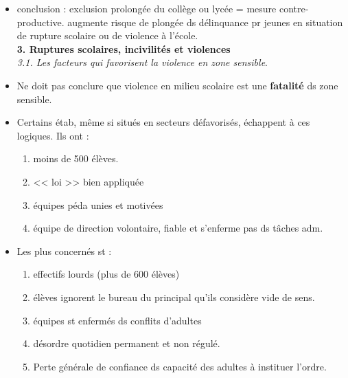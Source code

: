 \documentclass[12pt]{report}
\begin{document}
\begin{itemize}
\begin{itemize}
\vspace{0.5cm}

 \item conclusion : exclusion prolongée du collège ou lycée = mesure contre-productive. augmente risque de plongée ds délinquance pr jeunes en situation de rupture scolaire ou de violence à l'école.\\


\textbf{3. Ruptures scolaires, incivilités et violences} \\
\textit{3.1. Les facteurs qui favorisent la violence en zone sensible}.\\

\item Ne doit pas conclure que violence en milieu scolaire est une \textbf{fatalité} ds zone sensible.\\

\item Certains étab, même si situés en secteurs défavorisés, échappent à ces logiques. Ils ont : 
\begin{enumerate}
\item moins de 500 élèves.
\item << loi >> bien appliquée
\item équipes péda unies et motivées
\item équipe de direction volontaire, fiable et s'enferme pas ds tâches adm.
\end{enumerate}

\vspace{0.5cm}

\item  Les plus concernés st : 
\begin{enumerate}
\item effectifs lourds (plus de 600 élèves)
\item élèves ignorent le bureau du principal qu'ils considère vide de sens.
\item équipes st enfermés ds conflits d'adultes
\item désordre quotidien permanent et non  régulé.
\item Perte générale de confiance ds capacité des adultes à instituer l'ordre. \\
\end{enumerate}


\end{itemize}
\end{itemize}
\end{document}
